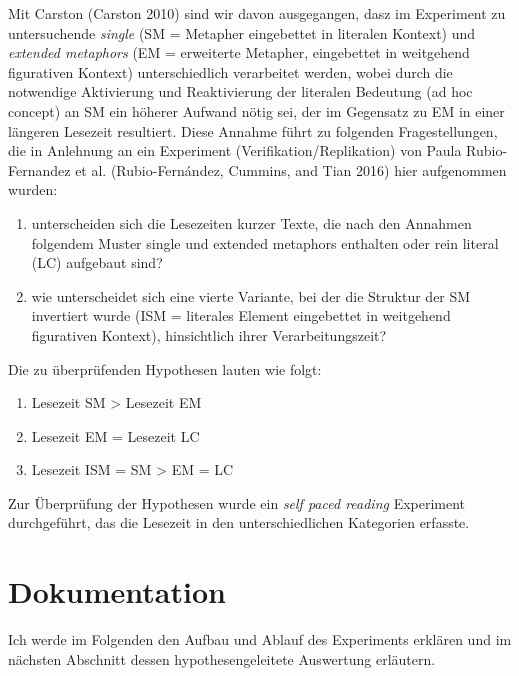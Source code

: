 \documentclass[
]{article}
\providecommand{\tightlist}{%
  \setlength{\itemsep}{0pt}\setlength{\parskip}{0pt}}
\begin{document}
Mit Carston (Carston 2010) sind wir davon ausgegangen, dasz im Experiment zu untersuchende \emph{single} (SM = Metapher eingebettet in literalen Kontext) und \emph{extended metaphors} (EM = erweiterte Metapher, eingebettet in weitgehend figurativen Kontext) unterschiedlich verarbeitet werden, wobei durch die notwendige Aktivierung und Reaktivierung der literalen Bedeutung (ad hoc concept) an SM ein höherer Aufwand nötig sei, der im Gegensatz zu EM in einer längeren Lesezeit resultiert. Diese Annahme führt zu folgenden Fragestellungen, die in Anlehnung an ein Experiment (Verifikation/Replikation) von Paula Rubio-Fernandez et al. (Rubio-Fernández, Cummins, and Tian 2016) hier aufgenommen wurden:

\begin{enumerate}
\def\labelenumi{\arabic{enumi}.}
\tightlist
\item
  unterscheiden sich die Lesezeiten kurzer Texte, die nach den Annahmen folgendem Muster single und extended metaphors enthalten oder rein literal (LC) aufgebaut sind?\\
\item
  wie unterscheidet sich eine vierte Variante, bei der die Struktur der SM invertiert wurde (ISM = literales Element eingebettet in weitgehend figurativen Kontext), hinsichtlich ihrer Verarbeitungszeit?
\end{enumerate}

Die zu überprüfenden Hypothesen lauten wie folgt:

\begin{enumerate}
\def\labelenumi{\arabic{enumi}.}
\tightlist
\item
  Lesezeit SM \textgreater{} Lesezeit EM\\
\item
  Lesezeit EM = Lesezeit LC\\
\item
  Lesezeit ISM = SM \textgreater{} EM = LC
\end{enumerate}

Zur Überprüfung der Hypothesen wurde ein \emph{self paced reading} Experiment durchgeführt, das die Lesezeit in den unterschiedlichen Kategorien erfasste.

\hypertarget{dokumentation}{%
\section{Dokumentation}\label{dokumentation}}

Ich werde im Folgenden den Aufbau und Ablauf des Experiments erklären und im nächsten Abschnitt dessen hypothesengeleitete Auswertung erläutern.
\end{document}
